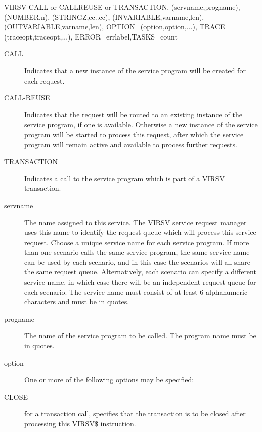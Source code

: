 \documentclass[letterpaper,10pt,english]{sphinxmanual}
\begin{document}
\begin{sphinxVerbatim}[commandchars=\\\{\}]
VIRSV\PYGZdl{} CALL or CALL\PYGZhy{}REUSE or TRANSACTION,
        (\PYGZsq{}servname\PYGZsq{},\PYGZsq{}progname\PYGZsq{}),
        (NUMBER,\PYGZsq{}n\PYGZsq{}),
        (STRINGZ,\PYGZsq{}cc..cc\PYGZsq{}),
        (IN\PYGZhy{}VARIABLE,\PYGZsq{}varname\PYGZsq{},len),
        (OUT\PYGZhy{}VARIABLE,\PYGZsq{}varname\PYGZsq{},len),
        OPTION=(option,option,...),
        TRACE=(traceopt,traceopt,...),
        ERROR=errlabel,TASKS=count
\end{sphinxVerbatim}
\begin{description}
\item[{CALL}] \leavevmode
Indicates that a new instance of the service program will be created for each request.

\item[{CALL-REUSE}] \leavevmode
Indicates that the request will be routed to an existing instance of the service program, if one is available. Otherwise a new instance of the service program will be started to process this request, after which the service program will remain active and available to process further requests.

\item[{TRANSACTION}] \leavevmode
Indicates a call to the service program which is part of a VIRSV transaction.

\item[{servname}] \leavevmode
The name assigned to this service. The VIRSV service request manager uses this name to identify the request queue which will process this service request. Choose a unique service name for each service program. If more than one scenario calls the same service program, the same service name can be used by each scenario, and in this case the scenarios will all share the same request queue. Alternatively, each scenario can specify a different service name, in which case there will be an independent request queue for each scenario. The service name must consist of at least 6 alphanumeric characters and must be in quotes.

\item[{progname}] \leavevmode
The name of the service program to be called. The program name must be in quotes.

\item[{option}] \leavevmode
One or more of the following options may be specified:

\item[{CLOSE}] \leavevmode
for a transaction call, specifies that the transaction is to be closed after processing this VIRSV\$ instruction.


\end{description}
\end{document}
